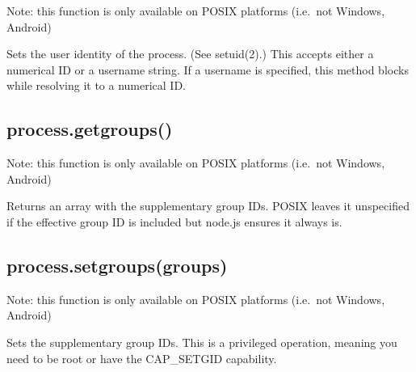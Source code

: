 Note: this function is only available on POSIX platforms (i.e.~not
Windows, Android)

Sets the user identity of the process. (See setuid(2).) This accepts
either a numerical ID or a username string. If a username is specified,
this method blocks while resolving it to a numerical ID.

\begin{Shaded}
\begin{Highlighting}[]
 \NormalTok{(} \NormalTok{&& }\NormalTok{) \{}
  \NormalTok{(} \NormalTok{+ }\NormalTok{());}
   \NormalTok{\{}
    \NormalTok{(}\NormalTok{);}
    \NormalTok{(} \NormalTok{+ }\NormalTok{());}
  \NormalTok{\}}
   
    \NormalTok{(} 
  \NormalTok{\}}
\NormalTok{\}}
\end{Highlighting}
\end{Shaded}

\subsection{process.getgroups()}\label{process.getgroups}

Note: this function is only available on POSIX platforms (i.e.~not
Windows, Android)

Returns an array with the supplementary group IDs. POSIX leaves it
unspecified if the effective group ID is included but node.js ensures it
always is.

\subsection{process.setgroups(groups)}\label{process.setgroupsgroups}

Note: this function is only available on POSIX platforms (i.e.~not
Windows, Android)

Sets the supplementary group IDs. This is a privileged operation,
meaning you need to be root or have the CAP\_SETGID capability.

